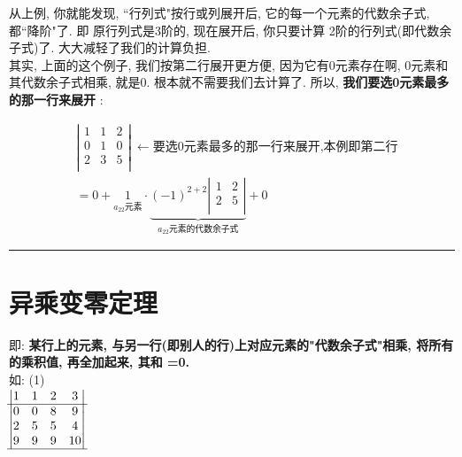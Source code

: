 \documentclass[UTF8]{ctexart}
\begin{document}
	从上例, 你就能发现, ``行列式"按行或列展开后, 它的每一个元素的代数余子式, 都``降阶"了. 即 原行列式是3阶的, 现在展开后, 你只要计算 2阶的行列式(即代数余子式)了. 大大减轻了我们的计算负担. \\
	
	其实, 上面的这个例子, 我们按第二行展开更方便, 因为它有0元素存在啊, 0元素和其代数余子式相乘, 就是0. 根本就不需要我们去计算了. 所以, \textbf{我们要选0元素最多的那一行来展开} : \\
	\begin{myEnvSample}
	\begin{align*}
	& \left| \begin{matrix}
		1&		1&		2\\
		0&		1&		0\\
		2&		3&		5\\
	\end{matrix} \right|\ ←\text{要选0元素最多的那一行来展开,本例即第二行}\\
	& =0+\underset{a_{22}\text{元素}}{1}\cdot \underset{a_{22}\text{元素的代数余子式}}{\underbrace{\left( -1 \right) ^{2+2}\left| \begin{matrix}
				1&		2\\
				2&		5\\
			\end{matrix} \right|}}+0
\end{align*}
	\end{myEnvSample}
	

	

	\hrule

	
	\section{异乘变零定理}
	
	即: \textbf{某行上的元素, 与另一行(即别人的行)上对应元素的"代数余子式"相乘, 将所有的乘积值, 再全加起来, 其和 =0.} \\
	
	如: (1) \\
	$
	\begin{matrix}
		\left| \begin{matrix}
			1&		1&		2&		3\\
			\hline
			0&		0&		8&		9\\
			2&		5&		5&		4\\
			9&		9&		9&		10\\
			\hline
		\end{matrix} \right|\\
	\end{matrix}
	$\\
	
\end{document}
